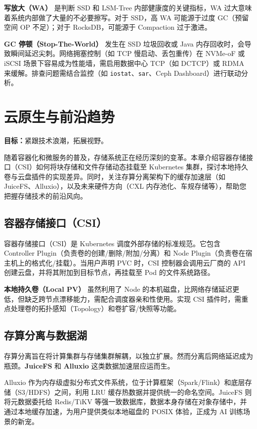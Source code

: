 \documentclass[12pt,UTF8]{ctexbook}
\begin{document}
	\textbf{写放大（WA）} 是判断 SSD 和 LSM-Tree 内部健康度的关键指标，WA 过大意味着系统内部做了大量的不必要擦写。对于 SSD，高 WA 可能源于过度 GC（预留空间 OP 不足）；对于 RocksDB，可能源于 Compaction 过于激进。
	
	\textbf{GC 停顿（Stop-The-World）} 发生在 SSD 垃圾回收或 Java 内存回收时，会导致瞬间延迟尖刺。网络拥塞控制（如 TCP 慢启动、丢包重传）在 NVMe-oF 或 iSCSI 场景下容易成为性能墙，需启用数据中心 TCP（如 DCTCP）或 RDMA 来缓解。排查问题需结合监控（如 \texttt{iostat}、\texttt{sar}、Ceph Dashboard）进行联动分析。
	
	\chapter{云原生与前沿趋势}
	\textbf{目标：}紧跟技术浪潮，拓展视野。
	
	随着容器化和微服务的普及，存储系统正在经历深刻的变革。本章介绍容器存储接口（CSI）如何将块存储和文件存储动态挂载至 Kubernetes 集群，探讨本地持久卷与云盘插件的实现差异。同时，关注存算分离架构下的缓存加速层（如 JuiceFS、Alluxio），以及未来硬件方向（CXL 内存池化、车规存储等），帮助您把握存储技术的前沿风向。
	
	\section{容器存储接口（CSI）}
	
	容器存储接口（CSI）是 Kubernetes 调度外部存储的标准规范。它包含 Controller Plugin（负责卷的创建/删除/附加/分离）和 Node Plugin（负责卷在宿主机上的格式化/挂载）。当用户声明 PVC 时，CSI 控制器会调用云厂商的 API 创建云盘，并将其附加到目标节点，再挂载至 Pod 的文件系统路径。
	
	\textbf{本地持久卷（Local PV）} 虽然利用了 Node 的本机磁盘，比网络存储延迟更低，但缺乏跨节点漂移能力，需配合调度器亲和性使用。实现 CSI 插件时，需重点处理卷的拓扑感知（Topology）和卷扩容/快照等功能。
	
	\section{存算分离与数据湖}
	
	存算分离旨在将计算集群与存储集群解耦，以独立扩展。然而分离后网络延迟成为瓶颈。\textbf{JuiceFS} 和 \textbf{Alluxio} 这类数据加速层应运而生。
	
	Alluxio 作为内存级虚拟分布式文件系统，位于计算框架（Spark/Flink）和底层存储（S3/HDFS）之间，利用 LRU 缓存热数据并提供统一的命名空间。JuiceFS 则将元数据委托给 Redis/TiKV 等强一致数据库，数据本身存储在对象存储中，并通过本地缓存加速，为用户提供类似本地磁盘的 POSIX 体验，正成为 AI 训练场景的新宠。
	
\end{document}
